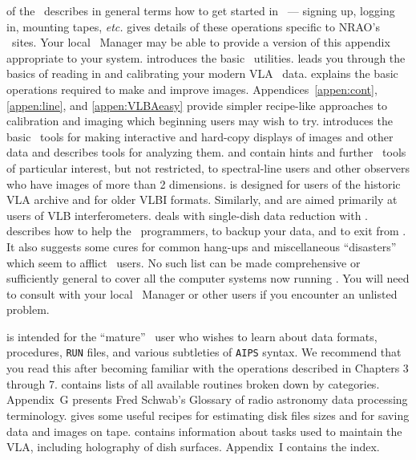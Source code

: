 
      of the \COOKBOOK\ describes in general terms how to
get started in \AIPS\ --- signing up, logging in, mounting tapes, {\it
etc.\/}   gives details of these operations specific to
NRAO's \AIPS\ sites.  Your local \AIPS\ Manager may be able to provide
a version of this appendix appropriate to your system.  
introduces the basic \AIPS\ utilities.   leads you through
the basics of reading in and calibrating your modern VLA \uv\ data.
 explains the basic operations required to make and
improve images.  Appendices~\ref{appen:cont}, \ref{appen:line}, and
\ref{appen:VLBAeasy} provide simpler recipe-like approaches to
calibration and imaging which beginning users may wish to try.
 introduces the basic \AIPS\ tools for making interactive
and hard-copy displays of images and other data and 
describes tools for analyzing them.   and 
contain hints and further \AIPS\ tools of particular interest, but not
restricted, to spectral-line users and other observers who have images
of more than 2 dimensions.   is designed for users of
the historic VLA archive and for older VLBI formats.  Similarly,
 and  are aimed primarily at users of VLB
interferometers.   deals with single-dish data reduction
with \AIPS\@.   describes how to help the \AIPS\
programmers, to backup your data, and to exit from \AIPS\@.  It also
suggests some cures for common hang-ups and miscellaneous
``disasters'' which seem to afflict \AIPS\ users.  No such list can be
made comprehensive or sufficiently general to cover all the computer
systems now running \AIPS\@.  You will need to consult with your local
\AIPS\ Manager or other users if you encounter an unlisted problem.

      is intended for the ``mature'' \AIPS\ user who
wishes to learn about data formats, procedures, {\tt RUN} files, and
various subtleties of {\tt AIPS} syntax.  We recommend that you read
this after becoming familiar with the operations described in Chapters
3 through 7.  \Rchap{list} contains lists of all available routines
broken down by categories.  Appendix~G presents Fred Schwab's Glossary
of radio astronomy data processing terminology.  \Rappen{size} gives
some useful recipes for estimating disk files sizes and for saving
data and images on tape.  \Rappen{VLAtasks} contains information
about tasks used to maintain the VLA, including holography of dish
surfaces.  Appendix~I contains the index.

